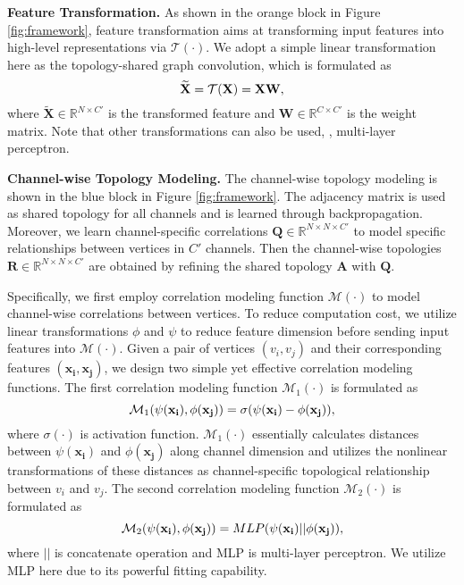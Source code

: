 \documentclass[10pt,twocolumn,letterpaper]{article}
\begin{document}
\noindent \textbf{Feature Transformation.} As shown in the orange block in Figure \ref{fig:framework}, feature transformation aims at transforming input features into high-level representations via $\mathcal{T}(\cdot)$. We adopt a simple linear transformation here as the topology-shared graph convolution, which is formulated as
\vspace{-0.2cm}
\begin{equation}
\vspace{-0.3cm}
\mathbf{\widetilde{X}}=\mathcal{T}(\mathbf{X})=\mathbf{XW},
\end{equation} 
where $\mathbf{\widetilde{X}} \in \mathbb{R}^{N \times C'}$ is the transformed feature and $\mathbf{W} \in \mathbb{R}^{C \times C'}$ is the weight matrix. Note that other transformations can also be used, \eg, multi-layer perceptron.

\noindent \textbf{Channel-wise Topology Modeling.} The channel-wise topology modeling is shown in the blue block in Figure \ref{fig:framework}. The adjacency matrix is used as shared topology for all channels and is learned through backpropagation. Moreover, we learn channel-specific correlations $\mathbf{Q} \in \mathbb{R}^{N \times N \times C'}$ to model specific relationships between vertices in $C'$ channels. Then the channel-wise topologies $\mathbf{R} \in \mathbb{R}^{N \times N \times C'}$ are obtained by refining the shared topology $\mathbf{A}$ with $\mathbf{Q}$.

Specifically, we first employ correlation modeling function $\mathcal{M}(\cdot)$ to model channel-wise correlations between vertices. To reduce computation cost, we utilize linear transformations $\phi$ and $\psi$ to reduce feature dimension before sending input features into $\mathcal{M}(\cdot)$. Given a pair of vertices $(v_i, v_j)$ and their corresponding features $(\mathbf{x_i}, \mathbf{x_j})$, we design two simple yet effective correlation modeling functions. The first correlation modeling function $\mathcal{M}_1(\cdot)$ is formulated as
\vspace{-0.16cm}
\begin{equation}
\vspace{-0.16cm}
\label{equ:cm1}
\mathcal{M}_1(\psi(\mathbf{x_i}), \phi(\mathbf{x_j}))=\sigma(\psi(\mathbf{x_i}) - \phi(\mathbf{x_j})),
\end{equation}
where $\sigma(\cdot)$ is activation function. $\mathcal{M}_1(\cdot)$ essentially calculates distances between $\psi(\mathbf{x_i})$ and $\phi(\mathbf{x_j})$ along channel dimension and utilizes the nonlinear transformations of these distances as channel-specific topological relationship between $v_i$ and $v_j$. The second correlation modeling function $\mathcal{M}_2(\cdot)$ is formulated as
\vspace{-0.16cm}
\begin{equation}
\vspace{-0.16cm}
\mathcal{M}_2(\psi(\mathbf{x_i}), \phi(\mathbf{x_j}))=MLP(\psi(\mathbf{x_i}) || \phi(\mathbf{x_j})),
\end{equation}
where $||$ is concatenate operation and MLP is multi-layer perceptron. We utilize MLP here due to its powerful fitting capability.
\end{document}

